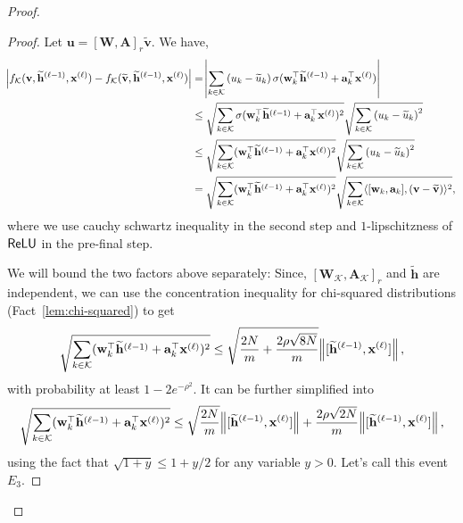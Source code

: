 \begin{proof}
	\begin{proof}
		Let $\mathbf{u} = [\mathbf{W}, \mathbf{A}]_r \widetilde{\mathbf{v}}$.  We have,
		\begin{align*}
			\abs{f_{\mathcal{K}}(\mathbf{v}, \widetilde{\mathbf{h}}^{(\ell-1)}, \mathbf{x}^{(\ell)}) - f_{\mathcal{K}}(\widetilde{\mathbf{v}}, \widetilde{\mathbf{h}}^{(\ell-1)}, \mathbf{x}^{(\ell)})}
			&=  \abs{\sum_{k \in \mathcal{K}} \left(u_k - \widetilde{u}_k\right)  \sigma(\mathbf{w}_k^{\top} \widetilde{\mathbf{h}}^{(\ell-1)} + \mathbf{a}_k^{\top} \mathbf{x}^{(\ell)})} \\  
			&\le \sqrt{\sum_{k \in \mathcal{K}}\sigma(\mathbf{w}_k^{\top} \widetilde{\mathbf{h}}^{(\ell-1)} + \mathbf{a}_k^{\top} \mathbf{x}^{(\ell)})^2 }  \sqrt{\sum_{k \in \mathcal{K}} \left( u_k - \widetilde{u}_k \right)^2} \\&
			\le \sqrt{\sum_{k \in \mathcal{K}} (\mathbf{w}_k^{\top} \widetilde{\mathbf{h}}^{(\ell-1)} + \mathbf{a}_k^{\top} \mathbf{x}^{(\ell)})^2 }  \sqrt{\sum_{k \in \mathcal{K}} \left( u_k - \widetilde{u}_k \right)^2}\\
			&= \sqrt{\sum_{k \in \mathcal{K}}(\mathbf{w}_k^{\top} \widetilde{\mathbf{h}}^{(\ell-1)} + \mathbf{a}_k^{\top} \mathbf{x}^{(\ell)})^2} \sqrt{\sum_{k \in \mathcal{K}} \langle [\mathbf{w}_k, \mathbf{a}_k], (\mathbf{v} - \widetilde{\mathbf{v}}) \rangle^2},
		\end{align*}
		where we use cauchy schwartz inequality in the second step and $1$-lipschitzness of $\mathsf{ReLU}$ in the pre-final step.
		
		We will bound the two factors above separately: %
		Since, $[\mathbf{W}_{\mathcal{K}}, \mathbf{A}_{\mathcal{K}}]_r$ and $\widetilde{\mathbf{h}}$ are independent, we can use the concentration inequality for chi-squared distributions (Fact~\ref{lem:chi-squared}) to get
		\begin{align*}
			\sqrt{\sum_{k \in \mathcal{K}}(\mathbf{w}_k^{\top} \widetilde{\mathbf{h}}^{(\ell-1)} + \mathbf{a}_k^{\top} \mathbf{x}^{(\ell)})^2} \leq \sqrt{\frac{2N}{m} + \frac{2\rho \sqrt{8N}}{m}} \norm{[\widetilde{\mathbf{h}}^{(\ell-1)}, \mathbf{x}^{(\ell)}]},
		\end{align*}
		with probability at least $1-2e^{-\rho^2}$. It can be further simplified into 
		\begin{equation*}
			\sqrt{\sum_{k \in \mathcal{K}}(\mathbf{w}_k^{\top} \widetilde{\mathbf{h}}^{(\ell-1)} + \mathbf{a}_k^{\top} \mathbf{x}^{(\ell)})^2} \leq \sqrt{\frac{2N}{m}} \norm{[\widetilde{\mathbf{h}}^{(\ell-1)}, \mathbf{x}^{(\ell)}]} + \frac{2\rho \sqrt{2N}}{m} \norm{[\widetilde{\mathbf{h}}^{(\ell-1)}, \mathbf{x}^{(\ell)}]},
		\end{equation*}
		using the fact that $\sqrt{1 + y} \le 1 + y/2$ for any variable $y > 0$. Let's call this event $E_3$.
		

\end{proof}
\end{proof}
